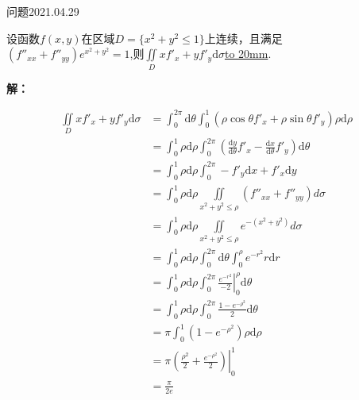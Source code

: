 \begin{mybox}{问题2021.04.29}
	
	\qquad 设函数$f(x,y)$在区域$D=\{x^2+y^2\le 1 \}$上连续，且满足\\
	$(f''_{xx}+f''_{yy})e^{x^2+y^2}=1$,则$\iint \limits_D xf'_{x}+yf'_{y}\mathrm{d}\sigma$\underline{\hbox to 20mm{}}.
\end{mybox}
\noindent
\textbf{解：}

\begin{align*}
\iint\limits_{D} xf'_{x}+yf'_{y}\mathrm{d}\sigma &=\int_{0}^{2\pi} \mathrm{d}\theta \int_{0}^{1}(\rho\cos \theta f'_{x}+\rho\sin \theta f'_{y})\rho \mathrm{d}\rho\\
&=\int_{0}^{1} \rho\mathrm{d}\rho \int_{0}^{2\pi} (\frac{\mathrm{d} y}{\mathrm{d} \theta}f'_{x}-\frac{\mathrm{d} x}{\mathrm{d} \theta}f'_{y})\mathrm{d}\theta\\
&=\int_{0}^{1}\rho\mathrm{d}\rho\int_{0}^{2\pi}-f'_{y}\mathrm{d}x+f'_{x}\mathrm{d}y\\
&=\int_{0}^{1}\rho\mathrm{d}\rho \iint\limits_{x^2+y^2\le \rho} (f''_{xx}+f''_{yy})d\sigma\\
&=\int_{0}^{1}\rho\mathrm{d}\rho \iint\limits_{x^2+y^2\le \rho} e^{-(x^2+y^2)}d\sigma\\
&=\int_{0}^{1}\rho \mathrm{d}\rho \int_{0}^{2\pi}\mathrm{d} \theta \int_{0}^{\rho} e^{-r^2} r\mathrm{d}r\\
&=\int_{0}^{1}\rho \mathrm{d}\rho \int_{0}^{2\pi} \left. \frac{e^{-r^2}}{-2} \right|_{0}^{\rho} \mathrm{d} \theta\\
&=\int_{0}^{1} \rho \mathrm{d}\rho \int_{0}^{2\pi}\frac{1-e^{-\rho^2}}{2}\mathrm{d}\theta \\
&=\pi\int_{0}^{1} (1-e^{-\rho^2})\rho \mathrm{d}\rho\\
&=\left.\pi(\frac{\rho^2}{2}+\frac{e^{-\rho^2}}{2})\right|_{0}^{1}\\
&=\frac{\pi}{2e}
\end{align*}